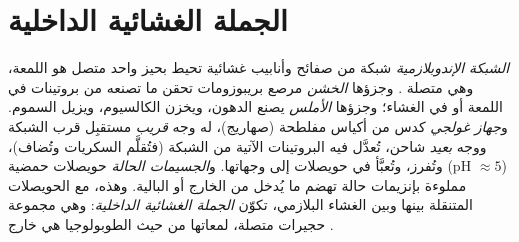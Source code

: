\section{الجملة الغشائية الداخلية}

\begin{definition}\label{def:b1:eukaryotic-cell:endomembrane}
\emph{الشبكة الإندوبلازمية} شبكة من صفائح
وأنابيب غشائية تحيط بحيز واحد متصل هو اللمعة، وهي متصلة . وجزؤها \emph{الخشن} مرصع
بريبوزومات تحقن ما تصنعه من بروتينات في اللمعة أو في الغشاء؛ وجزؤها
\emph{الأملس} يصنع الدهون، ويخزن
الكالسيوم، ويزيل السموم. و\emph{جهاز غولجي} كدس من
أكياس مفلطحة (صهاريج)، له وجه \emph{قريب} مستقبِل قرب الشبكة ووجه
\emph{بعيد} شاحن، تُعدَّل فيه البروتينات الآتية من الشبكة (فتُقلَّم
السكريات وتُضاف)، وتُفرز، وتُعبَّأ في حويصلات إلى وجهاتها.
و\emph{الجسيمات الحالة} حويصلات حمضية
(pH $\approx 5$) مملوءة بإنزيمات حالة تهضم ما يُدخل من الخارج أو
 البالية. وهذه، مع الحويصلات المتنقلة بينها وبين الغشاء
البلازمي، تكوّن \emph{الجملة الغشائية الداخلية}:
وهي مجموعة حجيرات متصلة، لمعاتها من حيث الطوبولوجيا هي خارج .
\end{definition}

